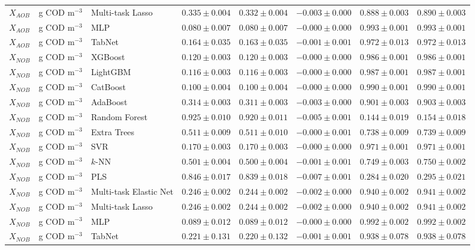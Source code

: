 \begin{longtable}{llp{3.1cm}rrrrr}
$X_{AOB}$ & g COD m$^{-3}$ & Multi-task Lasso & $0.335\pm0.004$ & $0.332\pm0.004$ & $-0.003\pm0.000$ & $0.888\pm0.003$ & $0.890\pm0.003$ \\
$X_{AOB}$ & g COD m$^{-3}$ & MLP & $0.080\pm0.007$ & $0.080\pm0.007$ & $-0.000\pm0.000$ & $0.993\pm0.001$ & $0.993\pm0.001$ \\
$X_{AOB}$ & g COD m$^{-3}$ & TabNet & $0.164\pm0.035$ & $0.163\pm0.035$ & $-0.001\pm0.001$ & $0.972\pm0.013$ & $0.972\pm0.013$ \\
$X_{NOB}$ & g COD m$^{-3}$ & XGBoost & $0.120\pm0.003$ & $0.120\pm0.003$ & $-0.000\pm0.000$ & $0.986\pm0.001$ & $0.986\pm0.001$ \\
$X_{NOB}$ & g COD m$^{-3}$ & LightGBM & $0.116\pm0.003$ & $0.116\pm0.003$ & $-0.000\pm0.000$ & $0.987\pm0.001$ & $0.987\pm0.001$ \\
$X_{NOB}$ & g COD m$^{-3}$ & CatBoost & $0.100\pm0.004$ & $0.100\pm0.004$ & $-0.000\pm0.000$ & $0.990\pm0.001$ & $0.990\pm0.001$ \\
$X_{NOB}$ & g COD m$^{-3}$ & AdaBoost & $0.314\pm0.003$ & $0.311\pm0.003$ & $-0.003\pm0.000$ & $0.901\pm0.003$ & $0.903\pm0.003$ \\
$X_{NOB}$ & g COD m$^{-3}$ & Random Forest & $0.925\pm0.010$ & $0.920\pm0.011$ & $-0.005\pm0.001$ & $0.144\pm0.019$ & $0.154\pm0.018$ \\
$X_{NOB}$ & g COD m$^{-3}$ & Extra Trees & $0.511\pm0.009$ & $0.511\pm0.010$ & $-0.000\pm0.001$ & $0.738\pm0.009$ & $0.739\pm0.009$ \\
$X_{NOB}$ & g COD m$^{-3}$ & SVR & $0.170\pm0.003$ & $0.170\pm0.003$ & $-0.000\pm0.000$ & $0.971\pm0.001$ & $0.971\pm0.001$ \\
$X_{NOB}$ & g COD m$^{-3}$ & $k$-NN & $0.501\pm0.004$ & $0.500\pm0.004$ & $-0.001\pm0.001$ & $0.749\pm0.003$ & $0.750\pm0.002$ \\
$X_{NOB}$ & g COD m$^{-3}$ & PLS & $0.846\pm0.017$ & $0.839\pm0.018$ & $-0.007\pm0.001$ & $0.284\pm0.020$ & $0.295\pm0.021$ \\
$X_{NOB}$ & g COD m$^{-3}$ & Multi-task Elastic Net & $0.246\pm0.002$ & $0.244\pm0.002$ & $-0.002\pm0.000$ & $0.940\pm0.002$ & $0.941\pm0.002$ \\
$X_{NOB}$ & g COD m$^{-3}$ & Multi-task Lasso & $0.246\pm0.002$ & $0.244\pm0.002$ & $-0.002\pm0.000$ & $0.940\pm0.002$ & $0.941\pm0.002$ \\
$X_{NOB}$ & g COD m$^{-3}$ & MLP & $0.089\pm0.012$ & $0.089\pm0.012$ & $-0.000\pm0.000$ & $0.992\pm0.002$ & $0.992\pm0.002$ \\
$X_{NOB}$ & g COD m$^{-3}$ & TabNet & $0.221\pm0.131$ & $0.220\pm0.132$ & $-0.001\pm0.001$ & $0.938\pm0.078$ & $0.938\pm0.078$ \\

\end{longtable}
